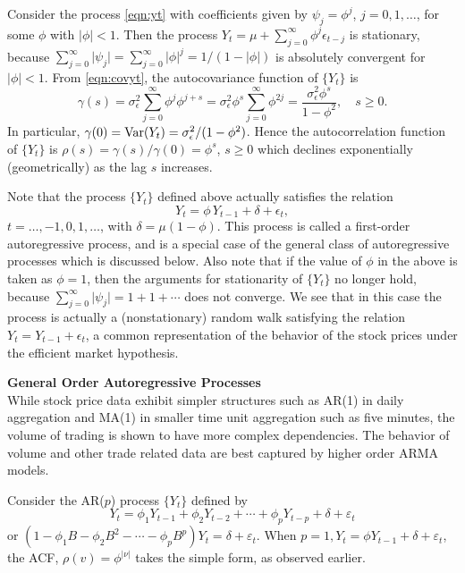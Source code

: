 \begin{ex} \label{ex:autoregor1}
Consider the process \eqref{eqn:yt} with coefficients given by $\psi_j = \phi^j$, $j= 0,1,\ldots$,  for some $\phi$ with $\lvert \phi \rvert < 1$. Then the process $Y_t = \mu + \sum_{j=0}^{\infty} \phi^j \epsilon_{t-j}$ is stationary, because $\sum_{j=0}^{\infty} \lvert \psi_j \rvert= \sum_{j=0}^{\infty} \lvert \phi \rvert^j = 1/(1 - \lvert \phi \rvert)$ is absolutely convergent for $\lvert \phi \rvert < 1$. From \eqref{eqn:covyt}, the autocovariance function of $\{ Y_t \}$ is
	\[
	\gamma(s)= \sigma^2_{\epsilon} \sum_{j=0}^{\infty} \phi^j \phi^{j+s}= \sigma^2_{\epsilon} \phi^s \sum_{j=0}^{\infty} \phi^{2j}= \frac{\sigma^2_{\epsilon} \phi^s}{1 - \phi^2}, \quad s \geq 0.
	\]
In particular, $\gamma(0) = \operatorname{Var}(Y_t) = \sigma^2_{\epsilon}/(1-\phi^2)$. Hence the autocorrelation function of $\{ Y_t \}$ is $\rho(s)= \gamma(s) / \gamma(0)= \phi^s$, $ s \geq 0$ which declines exponentially (geometrically) as the lag $s$ increases.


Note that the process $\{Y_t\}$ defined above actually satisfies the relation 
	\[
	Y_t= \phi \, Y_{t-1} + \delta+\epsilon_t,
	\]
$t= \ldots ,-1, 0, 1, \ldots$, with $\delta = \mu(1 - \phi)$. This process is called a first-order autoregressive process, and is a special case of the general class of autoregressive processes which is discussed below. Also note that if the value of $\phi$ in the above is taken as  $\phi = 1$, then the arguments for stationarity of $\{Y_t\}$ no longer hold, because $\sum_{j=0}^{\infty} \lvert \psi_j \rvert = 1 + 1 + \cdots$ does not converge. We see that in this case the process is actually a (nonstationary) random walk satisfying the relation  $Y_t = Y_{t-1} + \epsilon_t$, a common representation of the behavior of the stock prices under the efficient market hypothesis. \xqed
\end{ex}


\noindent\textbf{General Order Autoregressive Processes} \\


While stock price data exhibit simpler structures such as AR(1) in daily aggregation and MA(1) in smaller time unit aggregation such as five minutes, the volume of trading is shown to have more complex dependencies. The behavior of volume and other trade related data are best captured by higher order ARMA models. 

Consider the AR($p$) process $\{ Y_t \}$ defined by
	\begin{equation} \label{eqn:ytsum}
	Y_t = \phi_1 Y_{t-1} + \phi_2 Y_{t-2} + \cdots + \phi_p Y_{t-p} + \delta + \varepsilon_t
	\end{equation}
or $(1 - \phi_1 B - \phi_2 B^2 - \cdots - \phi_p B^p) Y_t = \delta + \varepsilon_t$. When $p= 1, Y_t = \phi Y_{t-1} + \delta + \varepsilon_t$, the ACF, $\rho(v)= \phi^{\lvert \nu \rvert}$ takes the simple form, as observed earlier.


